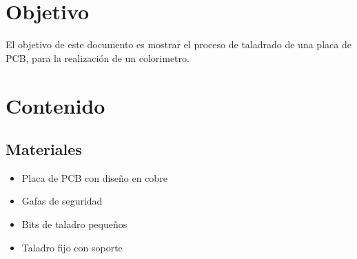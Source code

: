 \documentclass[12pt]{report}
\begin{document}
\chapter*{Objetivo}
El objetivo de este documento es mostrar el proceso de taladrado de una placa de PCB, para la realización de un colorimetro.
\newpage

\chapter{Contenido}
\section{Materiales}
\begin{itemize}
    \item Placa de PCB con diseño en cobre
    \item Gafas de seguridad
    \item Bits de taladro pequeños
    \item Taladro fijo con soporte
\end{itemize}
\end{document}
